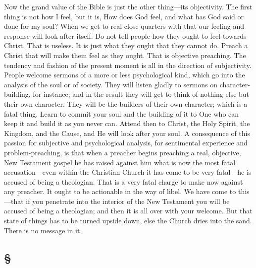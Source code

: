 \documentclass[draft]{ptfdoc}
\begin{document}
Now the grand value of the Bible is just the 
other thing---its objectivity. The first thing is 
not how I feel, but it is, How does God feel, 
and what has God said or done for my soul? 
When we get to real close quarters with that 
our feeling and response will look after itself. 
Do not tell people how they ought to feel 
towards Christ. That is useless. It is just 
what they ought that they cannot do. Preach 
a Christ that will make them feel as they ought. 
That is objective preaching. The tendency and 
fashion of the present moment is all in the 
direction of subjectivity. People welcome 
sermons of a more or less psychological kind, 
which go into the analysis of the soul or of 
society. They will listen gladly to sermons on 
character-building, for instance; and in the 
result they will get to think of nothing else 
but their own character. They will be the 
builders of their own character; which is a 
fatal thing. Learn to commit your soul and 
the building of it to One who can keep it 
and build it as you never can. Attend then to 
Christ, the Holy Spirit, the Kingdom, and the 
Cause, and He will look after your soul. A 
consequence of this passion for subjective and 
psychological analysis, for sentimental experience 
and problem-preaching, is that when 
a preacher begins preaching a real, objective, 
New Testament gospel he has raised against 
him what is now the most fatal accusation---even 
within the Christian Church it has come 
to be very fatal---he is accused of being a 
theologian. That is a very fatal charge to 
make now against any preacher. It ought to 
be actionable in the way of libel. We have 
come to this---that if you penetrate into the 
interior of the New Testament you will be 
accused of being a theologian; and then it is 
all over with your welcome. But that state 
of things has to be turned upside down, else 
the Church dries into the sand. There is no 
message in it. 

\subsection*{
\S
}
\end{document}

